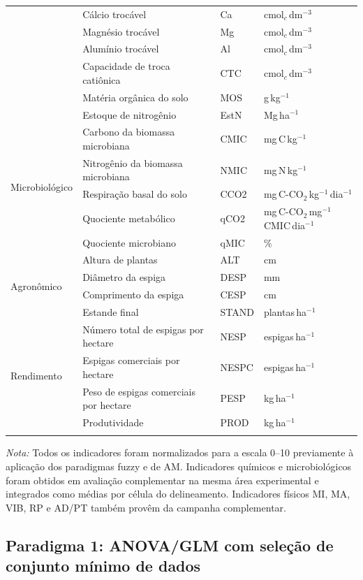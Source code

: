 \documentclass[pdflatex,sn-basic]{sn-jnl}%
\begin{document}
\begin{table}[h]
\begin{tabular*}{\textwidth}{@{\extracolsep\fill}llll}
  & Cálcio trocável & Ca & cmol$_c$\,dm$^{-3}$ \\
  & Magnésio trocável & Mg & cmol$_c$\,dm$^{-3}$ \\
  & Alumínio trocável & Al & cmol$_c$\,dm$^{-3}$ \\
  & Capacidade de troca catiônica & CTC & cmol$_c$\,dm$^{-3}$ \\
  & Matéria orgânica do solo & MOS & g\,kg$^{-1}$ \\
  & Estoque de nitrogênio & EstN & Mg\,ha$^{-1}$ \\
\midrule
\multirow{5}{*}{Microbiológico}
  & Carbono da biomassa microbiana & CMIC & mg\,C\,kg$^{-1}$ \\
  & Nitrogênio da biomassa microbiana & NMIC & mg\,N\,kg$^{-1}$ \\
  & Respiração basal do solo & CCO2 & mg\,C-CO$_2$\,kg$^{-1}$\,dia$^{-1}$ \\
  & Quociente metabólico & qCO2 & mg\,C-CO$_2$\,mg$^{-1}$\,CMIC\,dia$^{-1}$ \\
  & Quociente microbiano & qMIC & \% \\
\midrule
\multirow{4}{*}{Agronômico} 
  & Altura de plantas & ALT & cm \\
  & Diâmetro da espiga & DESP & mm \\
  & Comprimento da espiga & CESP & cm \\
  & Estande final & STAND & plantas\,ha$^{-1}$ \\
\midrule
\multirow{4}{*}{Rendimento} 
  & Número total de espigas por hectare & NESP & espigas\,ha$^{-1}$ \\
  & Espigas comerciais por hectare & NESPC & espigas\,ha$^{-1}$ \\
  & Peso de espigas comerciais por hectare & PESP & kg\,ha$^{-1}$ \\
  & Produtividade & PROD & kg\,ha$^{-1}$ \\
\botrule
\end{tabular*}
\smallskip\noindent\textit{Nota:} Todos os indicadores foram normalizados para a escala 0--10 previamente à aplicação dos paradigmas fuzzy e de AM. Indicadores químicos e microbiológicos foram obtidos em avaliação complementar \citep{Sara2019} na mesma área experimental e integrados como médias por célula do delineamento. Indicadores físicos MI, MA, VIB, RP e AD/PT também provêm da campanha complementar.
\end{table}

\subsection{Paradigma 1: ANOVA/GLM com seleção de conjunto mínimo de dados}\label{subsec:anova}
\end{document}
